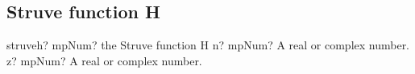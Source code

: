 %
%
%
%
%
%
%
%
%
%
%
%
%
%
%
%
%
%
%
%



\subsection{Struve function H}

\begin{mpFunctionsExtract}
	\mpFunctionTwo
	{struveh? mpNum? the Struve function H}
	{n? mpNum? A real or complex number.}
	{z? mpNum? A real or complex number.}	
\end{mpFunctionsExtract}


